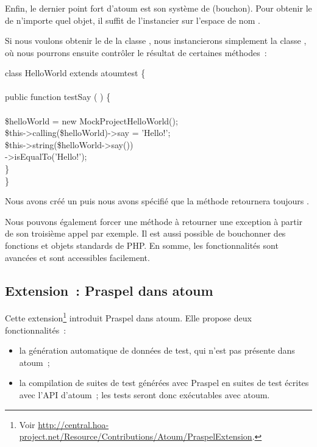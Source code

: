 \subsubsection{}

Enfin, le dernier point fort d'atoum est son système de 
(bouchon). Pour obtenir le  de n'importe quel objet, il suffit
de l'instancier sur l'espace de nom .

\begin{example}

Si nous voulons obtenir le  de la classe
, nous instancierons simplement la classe
, où nous pourrons ensuite
contrôler le résultat de certaines méthodes~:
%
\begin{pre}
class HelloWorld extends \bslash{}atoum\bslash{}test \{ \\
 \\
    public function testSay ( ) \{ \\
 \\
        \$helloWorld = new \bslash{}Mock\bslash{}Project\bslash{}HelloWorld(); \\
        \$this->calling(\$helloWorld)->say = 'Hello!'; \\
        \$this->string(\$helloWorld->say()) \\
                  ->isEqualTo('Hello!'); \\
    \} \\
\}
\end{pre}
%
Nous avons créé un  puis nous avons spécifié que la méthode
 retournera toujours .

\end{example}

Nous pouvons également forcer une méthode à retourner une exception à partir de
son troisième appel par exemple. Il est aussi possible de bouchonner des
fonctions et objets standards de PHP. En somme, les fonctionnalités sont
avancées et sont accessibles facilement.

\subsection{Extension~: Praspel dans atoum}
\label{subsection:tools:extension}

Cette extension\footnote{Voir
\url{http://central.hoa-project.net/Resource/Contributions/Atoum/PraspelExtension}.}
introduit Praspel dans atoum. Elle propose deux fonctionnalités~:
%
\begin{itemize}

\item la génération automatique de données de test, qui n'est pas présente dans
atoum~;

\item la compilation de suites de test générées avec Praspel en suites de test
écrites avec l'API d'atoum~; les tests seront donc exécutables avec atoum.

\end{itemize}

